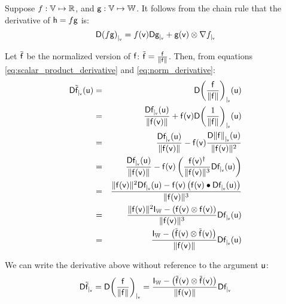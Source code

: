 \label{sec:Derivatives-of-scalar-products}

Suppose
$f:\Space{V} \mapsto \Reals$, and
$\g:\Space{V} \mapsto \Space{W}$.
It follows from the chain rule that the derivative of $\h = f\g$ is:
\begin{equation}
\label{eq:scalar_product_derivative}
\Db{(f\g)}{\v} =  f(\v) \Db{\g}{\v} + \g(\v) \otimes \Gb{f}{\v}
\end{equation}

\label{sec:Derivatives-of-normalized-functionss}

Let $\tilde{\f}$ be the normalized version of $\f$:
$\tilde{\f}  =  \frac{\f}{\| \f \|}$.
Then, from equations \ref{eq:scalar_product_derivative}
and \ref{eq:norm_derivative}:
\begin{eqnarray}
\Dc{\tilde{\f}}{\v}{\u}
& = &
\Dc{\left( \frac{\f}{\| \f \|}\right)}{\v}{\u}
\\
& = &
\frac{\Dc{\f}{\v}{\u}}{ \| \f(\v) \|}
 +
\f(\v)  \Dc{ \left( \frac{1}{\| \f \|} \right) }{\v}{\u} \nonumber \\
& = &
\frac{\Dc{\f}{\v}{\u}}
{\| \f(\v) \|}
 -
\f(\v)
\frac{\Dc{\| \f \|}{\v}{\u}}
{\|\f(\v)\|^2} \nonumber \\
& = &
\frac{\Dc{\f}{\v}{\u}}{ \| \f(\v) \| }
 -
\f(\v) \left( \frac{\f(\v)^\dagger}{\| \f(\v) \|^3}  \Dc{\f}{\v}{\u} \right) \nonumber \\
& = &
\frac{
\| \f(\v) \|^2 \Dc{\f}{\v}{\u}
 -
\f(\v)\left( \f(\v) \bullet \Dc{\f}{\v}{\u} \right)
}
{\| \f(\v) \|^3}  \nonumber \\
& = &
\frac{\| \f(\v) \|^2 \Identity_{\Space{W}} - \left( \f(\v) \otimes \f(\v) \right)  }
{ \| \f(\v) \|^3 }
\Dc{\f}{\v}{\u} \nonumber \\
& = &
\frac{\Identity_{\Space{W}} - \left( \tilde{\f}(\v) \otimes \tilde{\f}(\v) \right)  }
{\| \f(\v) \|}
\Dc{\f}{\v}{\u} \nonumber
\end{eqnarray}


We can write the derivative above without reference to the argument $\u$:
\begin{equation}
\label{eq:normalized_function_derivative}
\Db{\tilde{\f}}{\v}
 =
\Db{\left( \frac{\f}{\| \f \|} \right)}{\v}
 =
\frac{\Identity_{\Space{W}} - \left( \tilde{\f}(\v) \otimes \tilde{\f}(\v) \right) }
{ \| \f(\v) \| }
\Db{\f}{\v}
\end{equation}

